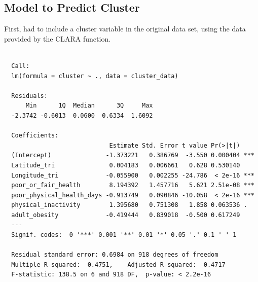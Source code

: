 \documentclass[12pt,twoside]{amherstthesis}
\begin{document}
  \subsection{Model to Predict Cluster}\label{model-to-predict-cluster}
  
  First, had to include a cluster variable in the original data set, using
  the data provided by the CLARA function.
  
  \begin{Shaded}
  \begin{Highlighting}[]
  \StringTok{ }\OperatorTok{$}
  \StringTok{ }
  \end{Highlighting}
  \end{Shaded}
  
  \begin{Shaded}
  \begin{Highlighting}[]
  \StringTok{ }\OperatorTok{~}
  \end{Highlighting}
  \end{Shaded}
  
  \begin{verbatim}
  
  Call:
  lm(formula = cluster ~ ., data = cluster_data)
  
  Residuals:
      Min      1Q  Median      3Q     Max 
  -2.3742 -0.6013  0.0600  0.6334  1.6092 
  
  Coefficients:
                             Estimate Std. Error t value Pr(>|t|)    
  (Intercept)               -1.373221   0.386769  -3.550 0.000404 ***
  Latitude_tri               0.004183   0.006661   0.628 0.530140    
  Longitude_tri             -0.055900   0.002255 -24.786  < 2e-16 ***
  poor_or_fair_health        8.194392   1.457716   5.621 2.51e-08 ***
  poor_physical_health_days -0.913749   0.090846 -10.058  < 2e-16 ***
  physical_inactivity        1.395680   0.751308   1.858 0.063536 .  
  adult_obesity             -0.419444   0.839018  -0.500 0.617249    
  ---
  Signif. codes:  0 '***' 0.001 '**' 0.01 '*' 0.05 '.' 0.1 ' ' 1
  
  Residual standard error: 0.6984 on 918 degrees of freedom
  Multiple R-squared:  0.4751,    Adjusted R-squared:  0.4717 
  F-statistic: 138.5 on 6 and 918 DF,  p-value: < 2.2e-16
  \end{verbatim}
  
\end{document}

